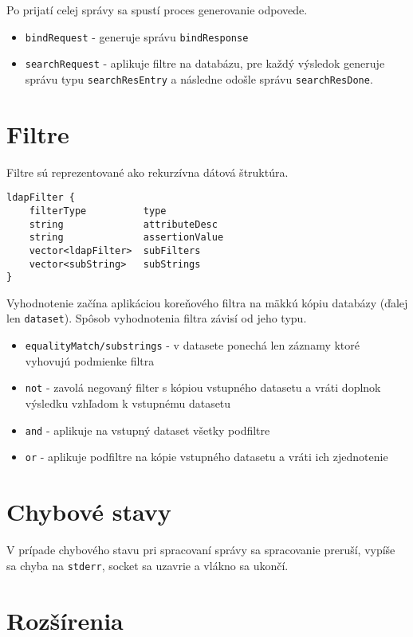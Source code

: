 \documentclass[12pt]{report}
\begin{document}
Po prijatí celej správy sa spustí proces generovanie odpovede.
\begin{itemize}
    \item \texttt{bindRequest} - generuje správu \texttt{bindResponse}
    \item \texttt{searchRequest} - aplikuje filtre na databázu, pre každý výsledok
        generuje správu typu \texttt{searchResEntry} a následne odošle správu \texttt{searchResDone}.
\end{itemize}

\section{Filtre}

Filtre sú reprezentované ako rekurzívna dátová štruktúra.
\begin{verbatim}
ldapFilter {
    filterType          type
    string              attributeDesc
    string              assertionValue
    vector<ldapFilter>  subFilters
    vector<subString>   subStrings
}
\end{verbatim}
Vyhodnotenie začína aplikáciou koreňového filtra na mäkkú kópiu databázy (ďalej len \texttt{dataset}).
Spôsob vyhodnotenia filtra závisí od jeho typu.
\begin{itemize}
    \item \texttt{equalityMatch/substrings} - v datasete ponechá len záznamy ktoré vyhovujú podmienke filtra
    \item \texttt{not} - zavolá negovaný filter s kópiou vstupného datasetu a vráti doplnok výsledku vzhľadom k vstupnému datasetu
    \item \texttt{and} - aplikuje na vstupný dataset všetky podfiltre
    \item \texttt{or} - aplikuje podfiltre na kópie vstupného datasetu a vráti ich zjednotenie
\end{itemize}

\section{Chybové stavy}

V prípade chybového stavu pri spracovaní správy sa spracovanie preruší, vypíše sa chyba na
\texttt{stderr}, socket sa uzavrie a vlákno sa ukončí.

\section{Rozšírenia}
\end{document}
